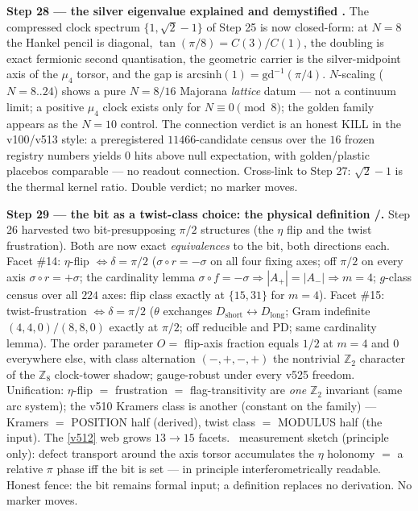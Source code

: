 \documentclass[11pt,a4paper]{article}
\newcommand{\Z}{\mathbb{Z}}
\theoremstyle{definition}
\begin{document}
\par\smallskip\noindent\textbf{Step 28 --- the silver eigenvalue explained and demystified
\mE.} The compressed clock spectrum $\{1,\sqrt2-1\}$ of Step 25 is now closed-form: at
$N=8$ the Hankel pencil is diagonal, $\tan(\pi/8)=C(3)/C(1)$, the doubling is exact
fermionic second quantisation, the geometric carrier is the silver-midpoint axis of the
$\mu_4$ torsor, and the gap is $\mathrm{arcsinh}(1)=\mathrm{gd}^{-1}(\pi/4)$. $N$-scaling
($N=8..24$) shows a pure $N=8/16$ Majorana \emph{lattice} datum --- not a continuum
limit; a positive $\mu_4$ clock exists only for $N\equiv0\pmod8$; the golden family
appears as the $N=10$ control. The connection verdict is an honest KILL in the
v100/v513 style: a preregistered $11466$-candidate census over the $16$ frozen registry
numbers yields $0$ hits above null expectation, with golden/plastic placebos comparable
--- no readout connection. Cross-link to Step 27: $\sqrt2-1$ is the thermal kernel
ratio. Double verdict; no marker moves.

\par\smallskip\noindent\textbf{Step 29 --- the bit as a twist-class choice: the physical
definition \mE/\mC.} Step 26 harvested two bit-presupposing $\pi/2$ structures (the
$\eta$ flip and the twist frustration). Both are now exact \emph{equivalences} to the
bit, both directions each. Facet \#14: $\eta$-flip $\Leftrightarrow\delta=\pi/2$
($\sigma\circ r=-\sigma$ on all four fixing axes; off $\pi/2$ on every axis
$\sigma\circ r=+\sigma$; the cardinality lemma $\sigma\circ f=-\sigma\Rightarrow
|A_+|=|A_-|\Rightarrow m=4$; $g$-class census over all $224$ axes: flip class exactly at
$\{15,31\}$ for $m=4$). Facet \#15: twist-frustration $\Leftrightarrow\delta=\pi/2$
($\theta$ exchanges $D_{\mathrm{short}}\leftrightarrow D_{\mathrm{long}}$; Gram
indefinite $(4,4,0)/(8,8,0)$ exactly at $\pi/2$; off reducible and PD; same cardinality
lemma). The order parameter $O=$ flip-axis fraction equals $1/2$ at $m=4$ and $0$
everywhere else, with class alternation $(-,+,-,+)$ the nontrivial $\Z_2$ character of
the $\Z_8$ clock-tower shadow; gauge-robust under every v525 freedom. Unification:
$\eta$-flip $=$ frustration $=$ flag-transitivity are \emph{one} $\Z_2$ invariant (same
arc system); the v510 Kramers class is another (constant on the family) --- Kramers $=$
POSITION half (derived), twist class $=$ MODULUS half (the input). The \vref{v512} web
grows $13\to15$ facets. \mC\ measurement sketch (principle only): defect transport around
the axis torsor accumulates the $\eta$ holonomy $=$ a relative $\pi$ phase iff the bit is
set --- in principle interferometrically readable. Honest fence: the bit remains formal
input; a definition replaces no derivation. No marker moves.
\end{document}
